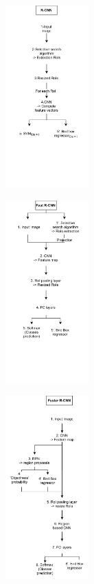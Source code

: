 \documentclass[12pt, french, a4paper]{article} %
\begin{document}
\begin{figure}[H]
\centering
   \begin{subfigure}{0.3\linewidth}
   \centering
   \includegraphics[height=7cm, keepratio]{figure/rcnn_F.png}
   \caption{}
   \label{fig:art_rcnn} 
\end{subfigure}
\hfill
\begin{subfigure}{0.3\linewidth}
   \centering
  \includegraphics[height=7cm, keepratio]{figure/fast_rcnn_f.png}
   \caption{}
   \label{fig:art_fast_rcnn}
\end{subfigure}
\hfill
\begin{subfigure}{0.3\linewidth}
   \centering
  \includegraphics[height=7cm, keepratio]{figure/faster_rcnn_f (1).png}
   \caption{}
   \label{fig:art_faster_rcnn}
\end{subfigure}
\end{figure}%
\end{document}

